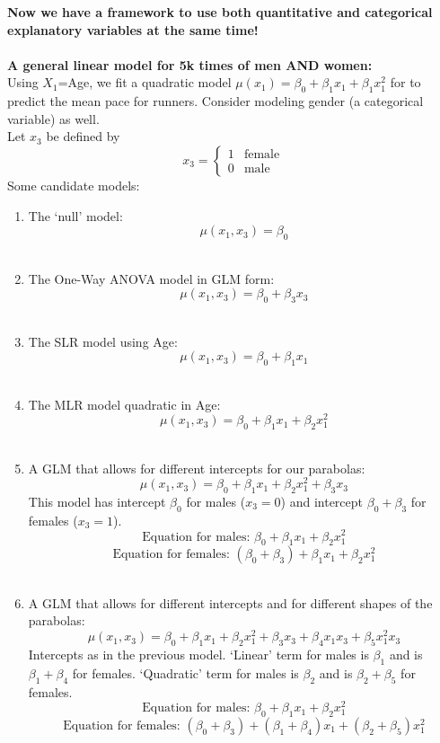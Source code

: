 \textbf{Now we have a framework to use both quantitative and categorical explanatory variables at the same time!}\\~\\
\textbf{A general linear model for 5k times of men AND women:}\\
Using $X_1$=Age, we fit a quadratic model $\mu(x_1) = \beta_0 + \beta_1 x_1 + \beta_1 x_1^2$ for to predict the mean pace for runners.  Consider modeling gender (a categorical variable) as well.\\
Let $x_3$ be defined by  
\[
x_3 = 
\begin{cases} 
1 & \text{female} \\ 0 & \text{male} 
\end{cases}
\]
Some candidate models:
\begin{enumerate}
\item The `null' model:
$$\mu(x_1,x_3) = \beta_0$$~\\
\item The One-Way ANOVA model in GLM form:
$$\mu(x_1,x_3) = \beta_0 + \beta_3 x_3$$~\\
\item The SLR model using Age:
$$\mu(x_1,x_3) = \beta_0 + \beta_1 x_1$$~\\
\item The MLR model quadratic in Age:
$$\mu(x_1,x_3) = \beta_0 + \beta_1 x_1+ \beta_2 x_1^2 $$~\\
\item A GLM that allows for different intercepts for our parabolas:  
$$\mu(x_1,x_3) = \beta_0 + \beta_1 x_1+ \beta_2 x_1^2+ \beta_3 x_3  $$
This model has intercept $\beta_0$ for males ($x_3=0$) and intercept $\beta_0+\beta_3$ for females ($x_3=1$).
$$\mbox{Equation for males: } \beta_0+\beta_1x_1+\beta_2x_1^2$$
$$\mbox{Equation for females: } (\beta_0+\beta_3)+\beta_1x_1+\beta_2x_1^2$$~\\
\item A GLM that allows for different intercepts and for different shapes of the parabolas:   
$$\mu(x_1,x_3) = \beta_0 + \beta_1 x_1+ \beta_2 x_1^2+ \beta_3 x_3 + \beta_4 x_1x_3 + \beta_5x_1^2x_3 $$
Intercepts as in the previous model.  `Linear' term for males is $\beta_1$ and is $\beta_1+\beta_4$ for females.  `Quadratic' term for males is $\beta_2$ and is $\beta_2+\beta_5$ for females. 
$$\mbox{Equation for males: } \beta_0+\beta_1x_1+\beta_2x_1^2$$
$$\mbox{Equation for females: } (\beta_0+\beta_3)+(\beta_1+\beta_4)x_1+(\beta_2+\beta_5)x_1^2$$~\\
\end{enumerate}

